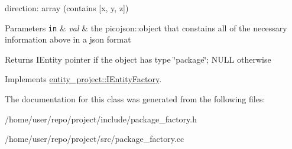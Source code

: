direction\+: array (contains \mbox{[}x, y, z\mbox{]})


\begin{DoxyParams}[1]{Parameters}
\mbox{\tt in}  & {\em val} & the picojson\+::object that constains all of the necessary information above in a json format \\
\hline
\end{DoxyParams}
\begin{DoxyReturn}{Returns}
I\+Entity pointer if the object has type \char`\"{}package\char`\"{}; N\+U\+LL otherwise 
\end{DoxyReturn}


Implements \hyperlink{classentity__project_1_1IEntityFactory_ac4e8eaf4294958fef0b98bd3684704bb}{entity\+\_\+project\+::\+I\+Entity\+Factory}.



The documentation for this class was generated from the following files\+:\begin{DoxyCompactItemize}
\item 
/home/user/repo/project/include/package\+\_\+factory.\+h\item 
/home/user/repo/project/src/package\+\_\+factory.\+cc\end{DoxyCompactItemize}
